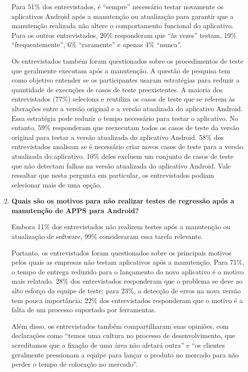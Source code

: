 \begin{enumerate}[label=\bf QP\arabic*]
Para 51\% dos entrevistados, é ``sempre'' necessário testar novamente os aplicativos Android após a manutenção ou atualização para garantir que a manutenção realizada não altere o comportamento funcional do aplicativo. Para os outros entrevistados, 20\% responderam que ``às vezes'' testam, 19\% ``frequentemente'', 6\% ``raramente'' e apenas 4\% ``nunca''.

Os entrevistados também foram questionados sobre os procedimentos de teste que geralmente executam após a manutenção. A questão de pesquisa tem como objetivo entender se os participantes usaram estratégias para reduzir a quantidade de execuções de casos de teste preexistentes. A maioria dos entrevistados (77\%) seleciona e reutiliza os casos de teste que se referem às alterações entre a versão original e a versão atualizada do aplicativo Android. Essa estratégia pode reduzir o tempo necessário para testar o aplicativo. No entanto, 59\% responderam que reexecutam todos os casos de teste da versão original para testar a versão atualizada do aplicativo Android. 58\% dos entrevistados analisam se é necessário criar novos casos de teste para a versão atualizada do aplicativo. 10\% deles excluem um conjunto de casos de teste que não detectam falhas na versão atualizada do aplicativo Android. Vale ressaltar que nesta pergunta em particular, os entrevistados podiam selecionar mais de uma opção.

    
\item \textbf{Quais são os motivos para não realizar testes de regressão após a manutenção de \ac{APPS} para Android?}

Embora 11\% dos entrevistados não realizem testes após a manutenção ou atualização de software, 99\% consideraram essa tarefa relevante.
 
Portanto, os entrevistados foram questionados sobre os principais motivos pelos quais as empresas não testam aplicativos após a manutenção. Para 71\%, o tempo de entrega reduzido para o lançamento do novo aplicativo é o motivo mais relatado. 28\% dos entrevistados responderam que o problema se deve ao alto esforço da equipe de teste; para 23\%, a detecção de erros na nova versão tem pouca importância; 22\% dos entrevistados responderam que o motivo é a falta de um processo suportado por ferramentas.

Além disso, os entrevistados também compartilharam suas opiniões, com declarações como ``temos uma cultura no processo de desenvolvimento, que acreditamos que a fixação de uma área não afetará outra'' e ``os clientes geralmente pressionam a equipe para lançar o produto no mercado para não perder o tempo de colocação no mercado''.



\end{enumerate}

